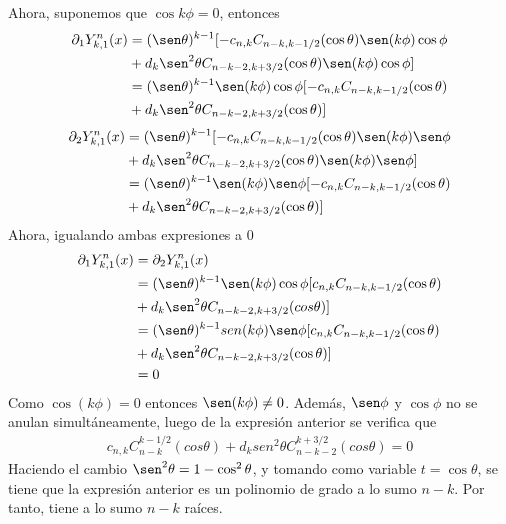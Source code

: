 Ahora, suponemos que $\cos k\phi = 0 $, entonces
\begin{gather}
\begin{aligned}
 \partial_1  Y_{k,1}^n(x) &= (\sen\theta)^{k-1}[-c_{n,k}C_{n-k,k-1/2}(\cos \theta)\sen(k\phi)\cos\phi \\&+ d_k \sen^2\theta C_{n-k-2,k+3/2}(\cos \theta)\sen(k\phi)\cos\phi] \\ &= (\sen\theta)^{k-1}\sen(k\phi)\cos\phi[-c_{n,k}C_{n-k,k-1/2}(\cos \theta) 
\\&+ d_k \sen^2\theta C_{n-k-2,k+3/2}(\cos \theta)]
\end{aligned}
\end{gather}
\begin{gather}
\begin{aligned}
\partial_2  Y_{k,1}^n(x) &= (\sen\theta)^{k-1}[-c_{n,k}C_{n-k,k-1/2}(\cos \theta)\sen(k\phi)\sen\phi \\&+ d_k \sen^2\theta C_{n-k-2,k+3/2}(\cos \theta)\sen(k\phi)\sen\phi] \\ &= (\sen\theta)^{k-1}\sen(k\phi)\sen\phi[-c_{n,k}C_{n-k,k-1/2}(\cos \theta) \\&+ d_k \sen^2\theta C_{n-k-2,k+3/2}(\cos \theta)]
\end{aligned}
\end{gather}
Ahora, igualando ambas expresiones a 0
\begin{gather}
\begin{aligned}
	\partial_1  Y_{k,1}^n(x) &= \partial_2  Y_{k,1}^n(x)  \\ &= (\sen\theta)^{k-1}\sen(k\phi)\cos\phi[c_{n,k}C_{n-k,k-1/2}(\cos \theta) \\&+ d_k \sen^2\theta C_{n-k-2,k+3/2}(cos \theta)]  \\ &= (\sen\theta)^{k-1}sen(k\phi)\sen\phi[c_{n,k}C_{n-k,k-1/2}(\cos \theta) \\&+ d_k \sen^2\theta C_{n-k-2,k+3/2}(\cos \theta)] \\ &= 0
\end{aligned}
\end{gather}
Como $\cos (k	\phi) = 0 $ entonces $\sen  (k\phi) \neq 0$. Además, $\sen \phi$ y $\cos\phi$ no se anulan simultáneamente, luego de la expresión anterior se verifica que
\begin{gather*}
c_{n,k}C_{n-k}^{k-1/2}(cos \theta) + d_k sen^2\theta C_{n-k-2}^{k+3/2}(cos \theta) = 0
\end{gather*}
Haciendo el cambio $\sen^2 \theta = 1-\cos^2\theta$, y tomando como variable $t=\cos\theta$, se tiene que la expresión anterior es un polinomio de grado a lo sumo $n-k$. Por tanto, tiene a lo sumo $n-k$ raíces.

